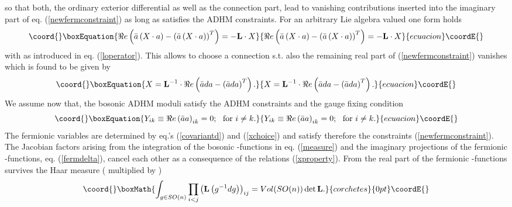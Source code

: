 \documentclass[a4paper,12pt]{article}
\begin{document}
so that both, the ordinary exterior differential as well as 
the \coordHE{} connection part, lead to vanishing contributions 
inserted into the imaginary part of eq. 
(\ref{newfermconstraint}) as long as \coordHE{} satisfies the ADHM 
constraints. For an arbitrary \coordHE{} Lie 
algebra valued one form \coordHE{} holds 
\begin{equation}\coord{}\boxEquation{
\Re e \left(\bar{a}\left(X\cdot a\right)-
\left(\bar{a}\left(X\cdot a\right)\right)^T \right)=-{\bf L}\cdot X 
\nonumber 
}{
\Re e \left(\bar{a}\left(X\cdot a\right)-
\left(\bar{a}\left(X\cdot a\right)\right)^T \right)=-{\bf L}\cdot X 
\nonumber 
}{ecuacion}\coordE{}\end{equation}
with \coordHE{} as introduced in eq. (\ref{loperator}). This allows 
to choose a connection s.t. also the remaining real part of 
(\ref{newfermconstraint}) vanishes which is found to be given by 
\begin{equation}\coord{}\boxEquation{
X={\bf L}^{-1}\cdot \Re e \left(\bar{a}da-
\left(\bar{a}da\right)^T\right).
\label{xchoice}
}{
X={\bf L}^{-1}\cdot \Re e \left(\bar{a}da-
\left(\bar{a}da\right)^T\right).
}{ecuacion}\coordE{}\end{equation}    
We assume now that, the bosonic ADHM moduli \coordHE{} satisfy the ADHM
constraints  and the gauge 
fixing condition 
\begin{equation}\coord{}\boxEquation{
Y_{ik}\equiv \Re e \left(\bar{a}a\right)_{ik}= 0; \,\,\,\, \mbox{for} \, \, 
i\neq k. \nonumber 
}{
Y_{ik}\equiv \Re e \left(\bar{a}a\right)_{ik}= 0; \,\,\,\, \mbox{for} \, \, 
i\neq k. \nonumber 
}{ecuacion}\coordE{}\end{equation}
The fermionic variables are determined by eq.'s (\ref{covariantd}) and 
(\ref{xchoice}) and satisfy therefore the constraints 
(\ref{newfermconstraint}). The Jacobian factors arising from the 
integration of the bosonic \myHighlight{$\delta$}\coordHE{}-functions in eq. (\ref{measure}) 
and the imaginary projections of the fermionic \myHighlight{$\delta$}\coordHE{}-functions, eq. 
(\ref{fermdelta}), cancel each other as a consequence of the 
relations (\ref{xproperty}). From the real part of the fermionic 
\myHighlight{$\delta$}\coordHE{}-functions survives the \coordHE{} Haar measure (
multiplied by \coordHE{})
\[\coord{}\boxMath{
\int_{g\in SO(n)}\prod_{i<j}\left({\bf L}\left(g^{-1}dg\right)\right)_{ij} 
=Vol(SO(n)) \det {\bf L}.
}{corchetes}{0pt}\coordE{}\]  
\end{document}
